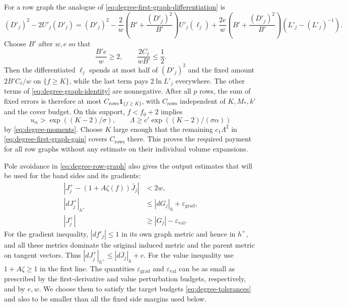 For a row graph the analogue of
\eqref{eq:degree-first-graph-differentiation} is
\[
 (D'_j)^2-2U'_j(D'_j)
  =(D'_j)^2-\frac2w\left(B'+\frac{(D'_j)^2}{B'}\right)U'_j(\ell_j)
       +\frac{2e}{w}\left(B'+\frac{(D'_j)^2}{B'}\right)
                      (L'_j-(L'_j)^{-1}).
\]
Choose $B'$ after $w,e$ so that
\begin{equation}\label{eq:degree-row-B-choice}
              \frac{B'e}{w}\ge2,\qquad
              \frac{2C_\ell}{wB'}\le\frac12.
\end{equation}
Then the differentiated $\ell_j$ spends at most half of $(D'_j)^2$ and
the fixed amount $2B'C_\ell/w$ on $\{f\ge K\}$, while the last term pays
$2\ln L'_j$ everywhere.  The other terms of
\eqref{eq:degree-graph-identity} are nonnegative.  After all $p$ rows,
the sum of fixed errors is therefore at most
$C_{\mathrm{rows}}\mathbf1_{\{f\ge K\}}$, with
$C_{\mathrm{rows}}$ independent of $K,M_*,k'$ and the cover budget.
On this support, $f<f_0+2$ implies
\[
  u_\alpha>\exp((K-2)/\sigma),\qquad
  \Lambda\ge c'\exp((K-2)/(\sigma\alpha))
\]
by \eqref{eq:degree-moments}.  Choose $K$ large enough that the remaining
$c_1\Lambda^2$ in \eqref{eq:degree-first-graph-gain} covers
$C_{\mathrm{rows}}$ there.  This proves the required payment for all row
graphs without any estimate on their individual volume expansions.

Pole avoidance in \eqref{eq:degree-row-graph} also gives the output
estimates that will be used for the band sides and its gradients:
\begin{equation}\label{eq:degree-output-estimates}
 \begin{split}
 |J_j^+-(1+A\zeta(f))\bar J_j|&<2w,\\
 |dJ_j^+|_{h^+}&\le |dG_j|_h+\varepsilon_{\mathrm{grad}},\\
 |J_j^+|&\ge |G_j|-\varepsilon_{\mathrm{val}}.
 \end{split}
\end{equation}
For the gradient inequality,
$|df'_j|\le1$ in its own graph metric and hence in $h^+$, and all these
metrics dominate the original induced metric and the parent metric on
tangent vectors.  Thus
$|dJ_j^+|_{h^+}\le|d\bar J_j|_h+e$.  For the value inequality use
$1+A\zeta\ge1$ in the first line.  The quantities
$\varepsilon_{\mathrm{grad}}$ and $\varepsilon_{\mathrm{val}}$ can be as
small as prescribed by the first-derivative and value perturbation
budgets, respectively, and by $e,w$.  We choose them to satisfy the
target budgets \eqref{eq:degree-tolerances} and also to be smaller than
all the fixed side margins used below.

